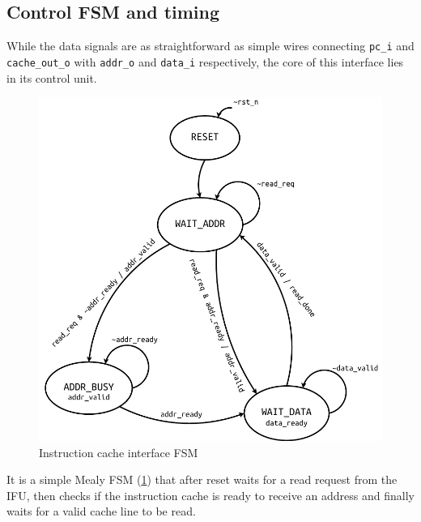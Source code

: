 \subsection{Control \acs{FSM} and timing}
While the data signals are as straightforward as simple wires connecting \texttt{pc\_i} and \texttt{cache\_out\_o} with \texttt{addr\_o} and \texttt{data\_i} respectively, the core of this interface lies in its control unit.
\begin{figure}[hbt]
  \centering
  \includegraphics[scale=.8]{img/icache_ifc_fsm.pdf}
  \caption{Instruction cache interface \acs{FSM}}
  \label{fig:icache_ifc_fsm}
\end{figure}
It is a simple Mealy \acs{FSM} (\cref{fig:icache_ifc_fsm}) that after reset waits for a read request from the \ac{IFU}, then checks if the instruction cache is ready to receive an address and finally waits for a valid cache line to be read.

